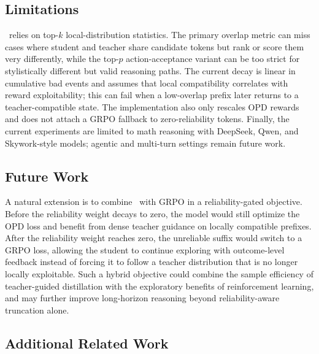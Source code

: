 \subsection{Limitations}

\method~relies on top-$k$ local-distribution statistics.
The primary overlap metric can miss cases where student and teacher share candidate tokens but rank or score them very differently, while the top-$p$ action-acceptance variant can be too strict for stylistically different but valid reasoning paths.
The current decay is linear in cumulative bad events and assumes that local compatibility correlates with reward exploitability; this can fail when a low-overlap prefix later returns to a teacher-compatible state.
The implementation also only rescales OPD rewards and does not attach a GRPO fallback to zero-reliability tokens.
Finally, the current experiments are limited to math reasoning with DeepSeek, Qwen, and Skywork-style models; agentic and multi-turn settings remain future work.

\subsection{Future Work}

A natural extension is to combine \method~with GRPO in a reliability-gated objective.
Before the reliability weight decays to zero, the model would still optimize the OPD loss and benefit from dense teacher guidance on locally compatible prefixes.
After the reliability weight reaches zero, the unreliable suffix would switch to a GRPO loss, allowing the student to continue exploring with outcome-level feedback instead of forcing it to follow a teacher distribution that is no longer locally exploitable.
Such a hybrid objective could combine the sample efficiency of teacher-guided distillation with the exploratory benefits of reinforcement learning, and may further improve long-horizon reasoning beyond reliability-aware truncation alone.



\subsection{Additional Related Work}
\label{app:related}
